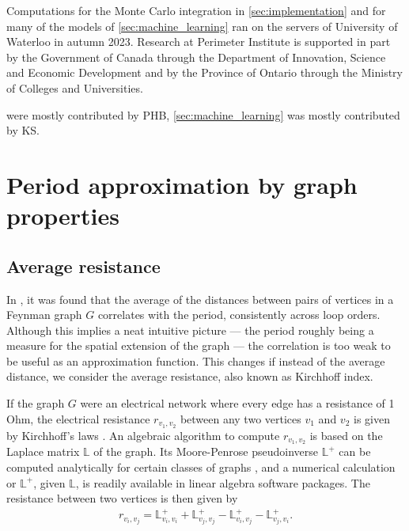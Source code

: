 \documentclass[12pt]{article}
\numberwithin{equation}{section}
\begin{document}
Computations for the Monte Carlo integration in \cref{sec:implementation} and for many of the models of \cref{sec:machine_learning} ran on the servers of University of Waterloo in autumn 2023. Research at Perimeter Institute is supported in part by the Government of Canada through the Department of
Innovation, Science and Economic Development and by the Province of Ontario through the Ministry of Colleges and Universities.

 were mostly contributed by PHB, \cref{sec:machine_learning} was mostly contributed by KS.




\newpage



\section{Period approximation by graph properties}\label{sec:estimation}



\subsection{Average resistance}\label{sec:resistance}
In \cite[Sec. 6]{balduf_statistics_2023}, it was found that the average of the distances between pairs of vertices in a Feynman graph $G$ correlates with the period, consistently across loop orders. Although this implies a neat intuitive picture --- the period roughly being a measure for the spatial extension of the graph --- the correlation is too weak to be useful as an approximation function. This changes if instead of the average distance, we consider the average resistance, also known as Kirchhoff index. 



If the graph $G$ were an electrical network where every edge has a resistance of 1 Ohm, the electrical resistance $r_{v_1,v_2}$  between any two vertices $v_1$ and $v_2$ is given by Kirchhoff's laws \cite{kirchhoff_ueber_1847}. An algebraic algorithm to compute $r_{v_1,v_2}$ is based on  the  Laplace matrix $\mathbb L$ of the graph. Its Moore-Penrose pseudoinverse  
$\mathbb L^+$ can be computed analytically for certain classes of graphs \cite{azimi_explicit_2023}, and a numerical calculation or $\mathbb L^+$, given $\mathbb L$, is readily available in linear algebra software packages. 
The resistance between two vertices is then  given by 
\begin{align*}
	r_{v_i,v_j}= \mathbb L^+_{v_i,v_i}+\mathbb L^+_{v_j,v_j}-\mathbb L^+_{v_i,v_j}-\mathbb L^+_{v_j,v_i}.
\end{align*}
\end{document}
